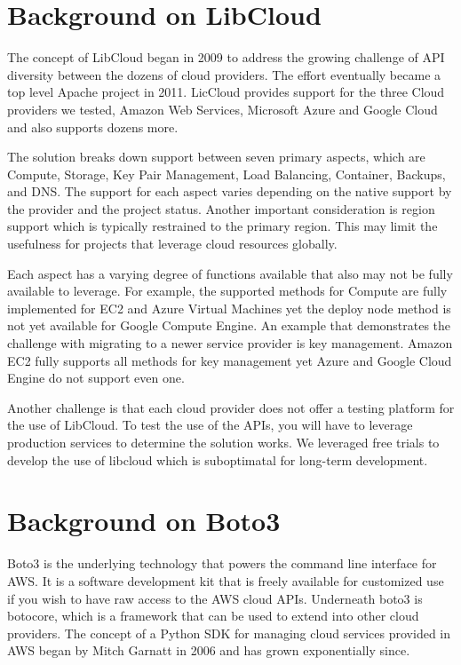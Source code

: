 \section{Background on LibCloud}

The concept of LibCloud began in 2009 to address the growing challenge of API diversity
between the dozens of cloud providers. The effort eventually became a top level Apache 
project in 2011. LicCloud provides support for the three Cloud providers we tested, 
Amazon Web Services, Microsoft Azure and Google Cloud and also supports dozens more.

The solution breaks down support between seven primary aspects, which are Compute, 
Storage, Key Pair Management, Load Balancing, Container, Backups, and DNS. The support
for each aspect varies depending on the native support by the provider and the project
status. Another important consideration is region support which is typically restrained
to the primary region. This may limit the usefulness for projects that leverage cloud
resources globally.

Each aspect has a varying degree of functions available that also may not be fully 
available to leverage. For example, the supported methods for Compute are fully 
implemented for EC2 and Azure Virtual Machines yet the deploy node method is not yet
available for Google Compute Engine. An example that demonstrates the challenge with
migrating to a newer service provider is key management. Amazon EC2 fully supports all 
methods for key management yet Azure and Google Cloud Engine do not support even one.

Another challenge is that each cloud provider does not offer a testing platform for the
use of LibCloud. To test the use of the APIs, you will have to leverage production 
services to determine the solution works. We leveraged free trials to develop the use 
of libcloud which is suboptimatal for long-term development.

\section{Background on Boto3}

Boto3 is the underlying technology that powers the command line interface for AWS. It is
a software development kit that is freely available for customized use if you wish to
have raw access to the AWS cloud APIs. Underneath boto3 is botocore, which is a framework 
that can be used to extend into other cloud providers. The concept of a Python SDK for 
managing cloud services provided in AWS began by Mitch Garnatt in 2006 and has grown 
exponentially since.~\cite{hid-sp18-518-AWS-boto3}


